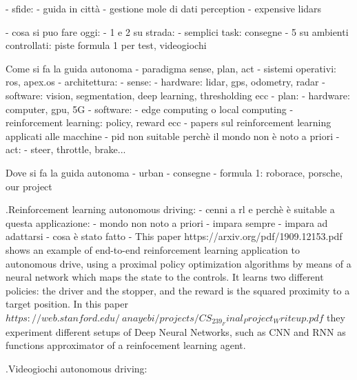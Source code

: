 	- sfide:
		- guida in città
		- gestione mole di dati perception
		- expensive lidars
		
- cosa si puo fare oggi:
	- 1 e 2 su strada: 
	- semplici task: consegne
	- 5 su ambienti controllati: piste formula 1 per test, videogiochi
	
	
Come si fa la guida autonoma
	- paradigma sense, plan, act
	- sistemi operativi: ros, apex.os
	- architettura: 
		- sense: 
			- hardware: lidar, gps, odometry, radar
			- software: vision, segmentation, deep learning, thresholding ecc
		- plan:
			- hardware: computer, gpu, 5G
			- software: 
				- edge computing o local computing
				- reinforcement learning: policy, reward ecc
					- papers sul reinforcement learning applicati alle macchine
				- pid non suitable perchè il mondo non è noto a priori
		- act:
			- steer, throttle, brake...

Dove si fa la guida autonoma
	- urban
	- consegne
	- formula 1: roborace, porsche, our project



.Reinforcement learning autonomous driving:
	- cenni a rl e perchè è suitable a questa applicazione:
			- mondo non noto a priori
			- impara sempre
			- impara ad adattarsi
	- cosa è stato fatto
		- 
This paper https://arxiv.org/pdf/1909.12153.pdf shows an example of end-to-end reinforcement learning application to autonomous drive, using a proximal policy optimization algorithms by means of a neural network which maps the state to the controls. It learns two different policies: the driver and the stopper, and the reward is the squared proximity to a target position.
In this paper $https://web.stanford.edu/~anayebi/projects/CS_239_Final_Project_Writeup.pdf$ they experiment different setups of Deep Neural Networks, such as CNN and RNN as functions approximator of a reinfocement learning agent.


.Videogiochi autonomous driving:

